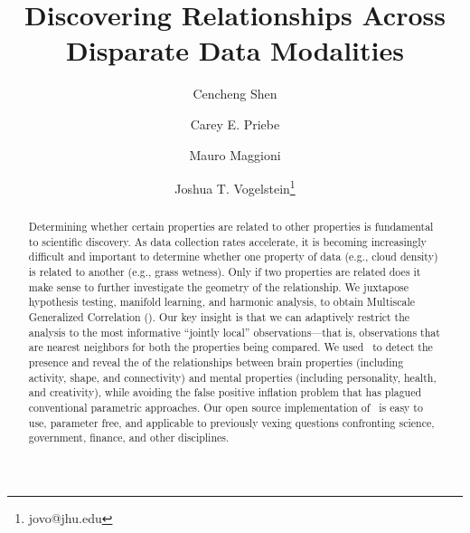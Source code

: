 \documentclass[11pt]{article}
\begin{document}
\def\spacingset#1{\renewcommand{\baselinestretch}%
{#1}\small\normalsize} \spacingset{1}
\title{\vspace{-2em}\bf Discovering  Relationships Across Disparate Data Modalities}

\author[1,2]{Cencheng Shen} %
\author[1,3]{Carey E. Priebe}%
\author[3,4,6]{Mauro Maggioni}%
\author[1,5,6,7]{Joshua T. Vogelstein\thanks{jovo@jhu.edu}}
\maketitle 
\thispagestyle{empty}
\date{}
\vspace{-15pt}
\begin{abstract}
Determining whether certain properties are related to other properties is fundamental to scientific discovery. As data collection rates accelerate, it is becoming increasingly difficult and important to determine whether one property of data (e.g., cloud density) is related to another (e.g., grass wetness). Only if two properties are related does it make sense to further investigate the geometry of the relationship. 
We juxtapose hypothesis testing, manifold learning, and harmonic analysis, to obtain Multiscale Generalized Correlation (\Mgc). 
Our key insight is that we can adaptively restrict the analysis to the most informative ``jointly local'' observations---that is, observations that are nearest neighbors for both the properties being compared. 
We used \Mgc~to detect the presence and reveal the  of the relationships between brain properties (including activity, shape, and connectivity) and mental properties (including personality, health, and creativity), while avoiding  the false positive inflation problem that has plagued conventional parametric approaches. 
Our open source implementation of \Mgc~is easy to use, parameter free, and applicable to previously vexing questions confronting science, government, finance, and other disciplines. 
\end{abstract}
\end{document}
